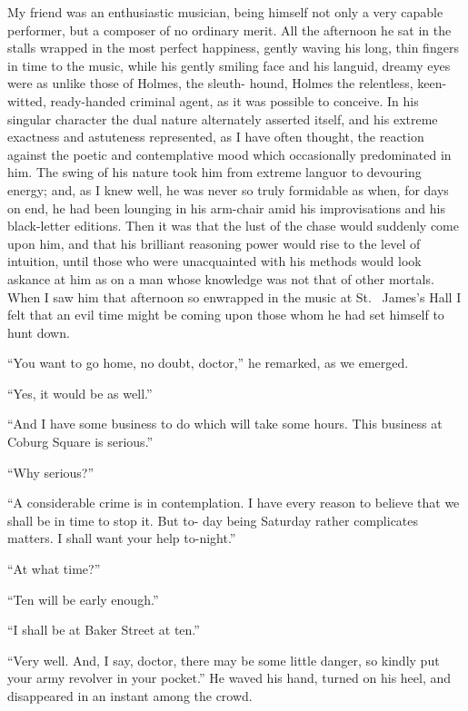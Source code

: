 My friend was an enthusiastic musician, being himself not
only a very capable performer, but a composer of no ordinary
merit. All the afternoon he sat in the stalls wrapped in the
most perfect happiness, gently waving his long, thin fingers
in time to the music, while his gently smiling face and his languid,
dreamy eyes were as unlike those of Holmes, the sleuth-%
hound, Holmes the relentless, keen-witted, ready-handed criminal
agent, as it was possible to conceive. In his singular
character the dual nature alternately asserted itself, and his
extreme exactness and astuteness represented, as I have often
thought, the reaction against the poetic and contemplative
mood which occasionally predominated in him. The swing
of his nature took him from extreme languor to devouring
energy; and, as I knew well, he was never so truly formidable
as when, for days on end, he had been lounging in his
arm-chair amid his improvisations and his black-letter editions.
Then it was that the lust of the chase would suddenly
come upon him, and that his brilliant reasoning power would
rise to the level of intuition, until those who were unacquainted
with his methods would look askance at him as on a man
whose knowledge was not that of other mortals. When I
saw him that afternoon so enwrapped in the music at St.\ %
James’s Hall I felt that an evil time might be coming upon
those whom he had set himself to hunt down.

“You want to go home, no doubt, doctor,” he remarked,
as we emerged.

“Yes, it would be as well.”

“And I have some business to do which will take some
hours. This business at Coburg Square is serious.”

“Why serious?”

“A considerable crime is in contemplation. I have every
reason to believe that we shall be in time to stop it. But to-%
day being Saturday rather complicates matters. I shall want
your help to-night.”

“At what time?”

“Ten will be early enough.”

“I shall be at Baker Street at ten.”

“Very well. And, I say, doctor, there may be some little
danger, so kindly put your army revolver in your pocket.”
He waved his hand, turned on his heel, and disappeared in
an instant among the crowd.

